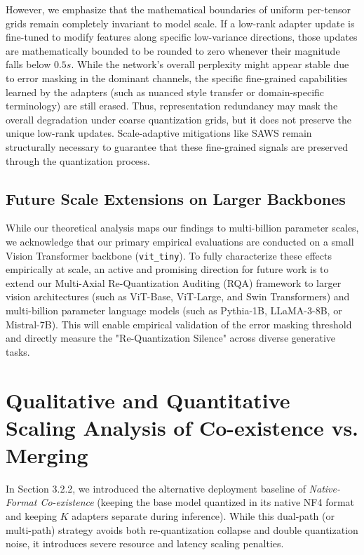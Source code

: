 \documentclass{article}
\theoremstyle{plain}
\theoremstyle{definition}
\theoremstyle{remark}
\begin{document}
However, we emphasize that the mathematical boundaries of uniform per-tensor grids remain completely invariant to model scale. If a low-rank adapter update is fine-tuned to modify features along specific low-variance directions, those updates are mathematically bounded to be rounded to zero whenever their magnitude falls below $0.5 s$. While the network's overall perplexity might appear stable due to error masking in the dominant channels, the specific fine-grained capabilities learned by the adapters (such as nuanced style transfer or domain-specific terminology) are still erased. Thus, representation redundancy may mask the overall degradation under coarse quantization grids, but it does not preserve the unique low-rank updates. Scale-adaptive mitigations like SAWS remain structurally necessary to guarantee that these fine-grained signals are preserved through the quantization process.

\subsection{Future Scale Extensions on Larger Backbones}
While our theoretical analysis maps our findings to multi-billion parameter scales, we acknowledge that our primary empirical evaluations are conducted on a small Vision Transformer backbone (\texttt{vit\_tiny}). To fully characterize these effects empirically at scale, an active and promising direction for future work is to extend our Multi-Axial Re-Quantization Auditing (RQA) framework to larger vision architectures (such as ViT-Base, ViT-Large, and Swin Transformers) and multi-billion parameter language models (such as Pythia-1B, LLaMA-3-8B, or Mistral-7B). This will enable empirical validation of the error masking threshold and directly measure the "Re-Quantization Silence" across diverse generative tasks.

\section{Qualitative and Quantitative Scaling Analysis of Co-existence vs. Merging}
\label{app:coexistence_vs_merging}

In Section 3.2.2, we introduced the alternative deployment baseline of \emph{Native-Format Co-existence} (keeping the base model quantized in its native NF4 format and keeping $K$ adapters separate during inference). While this dual-path (or multi-path) strategy avoids both re-quantization collapse and double quantization noise, it introduces severe resource and latency scaling penalties. 
\end{document}
